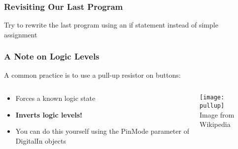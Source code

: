 \begin{frame}[fragile]
	\frametitle{Revisiting Our Last Program}
	Try to rewrite the last program using an if statement instead of simple assignment
	\pause
	
\end{frame}

\begin{frame}
	\frametitle{A Note on Logic Levels}
	A common practice is to use a pull-up resistor on buttons:
	\begin{columns}[c]
		\begin{column}{0.5\textwidth}
			\begin{itemize}
				\item Forces a known logic state
				\item \textbf{Inverts logic levels!}
				\item You can do this yourself using the PinMode parameter of DigitalIn objects
			\end{itemize}
		\end{column}
		\begin{column}{0.5\textwidth}
			\begin{center}
				\texttt{[image: pullup]}\\
				\tiny Image from Wikipedia
			\end{center}
		\end{column}
	\end{columns}
\end{frame}